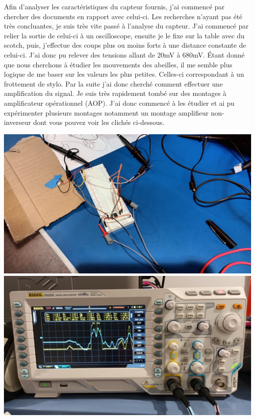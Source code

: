 \documentclass[12pt,french,a4paper]{article}
\begin{document}
Afin d'analyser les caractéristiques du capteur fournis, j'ai commencé par chercher des documents en rapport avec celui-ci. Les recherches n'ayant pas 
été très concluantes, je suis très vite passé à l'analyse du capteur. J'ai commencé par relier la sortie de celui-ci à un oscilloscope, ensuite je le fixe
sur la table avec du scotch, puis, j'effectue des coups plus ou moins forts à une distance constante de celui-ci. J'ai donc pu relever des tensions allant de 20mV à 680mV.
Étant donné que nous cherchons à étudier les mouvements des abeilles, il me semble plus logique de me baser sur les valeurs les plus petites. Celles-ci correspondant à un frottement de stylo.
Par la suite j'ai donc cherché comment effectuer une amplification du signal. Je suis très rapidement tombé sur des montages à amplificateur opérationnel (AOP). J'ai donc commencé
à les étudier et ai pu expérimenter plusieurs montages notamment un montage amplifieur non-inverseur dont vous pouvez voir les clichés ci-dessous.
\begin{center}	
	\includegraphics[scale=0.08]{../img/montage_piezo_aop.jpg}
	\label{image3}
	\includegraphics[scale=0.08]{../img/sortie_osciloscope.jpg}
	\label{image4}
\end{center}
\end{document}
